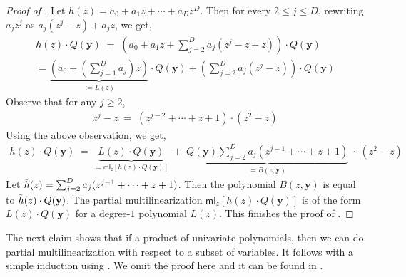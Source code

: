 \documentclass[11pt]{article}
\newcommand{\paren}[1]{\left( #1 \right)}
\newcommand{\ml}{\mathsf{ml}}
\begin{document}
\begin{proof}[Proof of ]
Let $h(z) = a_{0} + a_{1} z + \cdots + a_{D} z^{D}$. Then for every $2 \leq j \leq D$, rewriting $a_{j} z^{j}$ as $a_{j}(z^{j} - z) + a_{j} z$, we get,
\begin{align*}
    h(z) \cdot Q(\mathbf{y}) \; = \; \paren{a_{0} + a_{1} z + \sum_{j=2}^{D} a_{j} (z^{j} - z + z)} \cdot Q(\mathbf{y}) \\
    =  \underbrace{\paren{a_{0} + \paren{\sum_{j=1}^{D} a_{j}} z}}_{:= L(z)} \cdot Q(\mathbf{y}) + \paren{\sum_{j=2}^{D} a_{j} (z^{j} - z)} \cdot Q(\mathbf{y})
\end{align*}
Observe that for any $j \geq 2$,
\begin{align*}
    z^{j} - z \; = \; \paren{z^{j-2} + \cdots + z + 1} \cdot (z^{2} - z)
\end{align*}
Using the above observation, we get,
\begin{align*}
    h(z) \cdot Q(\mathbf{y}) \; = \;  \underbrace{L(z) \cdot Q(\mathbf{y})}_{= \ml_{z}[h(z) \cdot Q(\mathbf{y})]} \; + \; \underbrace{Q(\mathbf{y}) \sum_{j=2}^{D} a_{j}  \paren{z^{j-1} + \cdots + z + 1} }_{= B(z, \mathbf{y})} \; \cdot \; (z^{2} - z)
\end{align*}
Let $\Tilde{h}(z) = \sum_{j=2}^{D} a_{j} (z^{j-1}+\cdots+z+1)$. Then the polynomial $B(z, \mathbf{y})$ is equal to $\Tilde{h}(z) \cdot Q(\mathbf{y})$. The partial multilinearization $\ml_{z}[h(z) \cdot Q(\mathbf{y})]$ is of the form $L(z) \cdot Q(\mathbf{y})$ for a degree-$1$ polynomial $L(z)$. This finishes the proof of .
\end{proof}

The next claim shows that if a product of univariate polynomials, then we can do partial multilinearization with respect to a subset of variables. It follows with a simple induction using . We omit the proof here and it can be found in .
\end{document}
